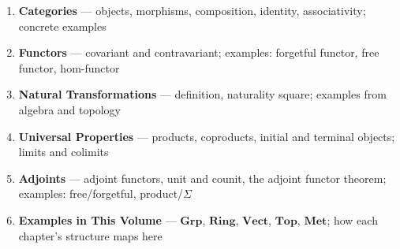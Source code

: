 \vspace{0.5em}

\begin{tcolorbox}[
  colback=amber!6,
  colframe=amber!40,
  arc=2pt,
  left=8pt, right=8pt, top=6pt, bottom=6pt,
  title={\small\textbf{Planned Content}},
  fonttitle=\small\bfseries
]
\small
\begin{enumerate}
  \item \textbf{Categories} --- objects, morphisms, composition,
        identity, associativity; concrete examples
  \item \textbf{Functors} --- covariant and contravariant; examples:
        forgetful functor, free functor, hom-functor
  \item \textbf{Natural Transformations} --- definition,
        naturality square; examples from algebra and topology
  \item \textbf{Universal Properties} --- products, coproducts,
        initial and terminal objects; limits and colimits
  \item \textbf{Adjoints} --- adjoint functors, unit and counit,
        the adjoint functor theorem; examples: free/forgetful,
        product/$\Sigma$
  \item \textbf{Examples in This Volume} --- $\mathbf{Grp}$,
        $\mathbf{Ring}$, $\mathbf{Vect}$, $\mathbf{Top}$,
        $\mathbf{Met}$; how each chapter's structure maps here
\end{enumerate}
\end{tcolorbox}


